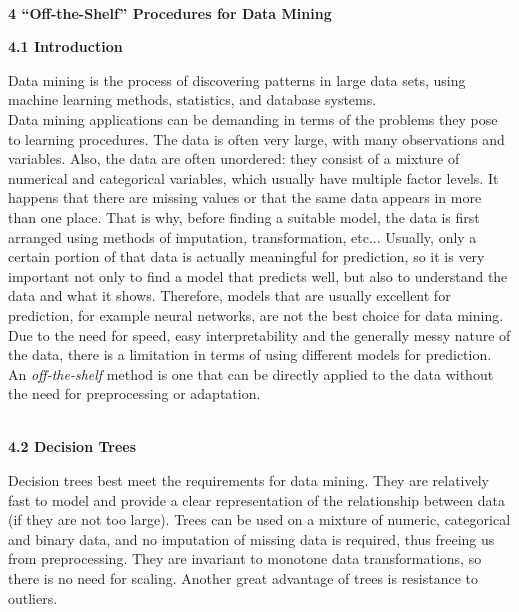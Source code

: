 \documentclass[12pt, letterpaper, twoside]{article}
\begin{document}
\begin{center}
\textbf{\large{\\4 “Off-the-Shelf” Procedures for Data Mining}\\}
\end{center}
\begin{center}
\textbf{\large{4.1 Introduction}\\}
\end{center}
\hspace*{4ex}Data mining is the process of discovering patterns in large data sets, using machine learning methods, statistics, and database systems.\\ 
\hspace*{4ex}Data mining applications can be demanding in terms of the problems they pose to learning procedures. The data is often very large, with many observations and variables. Also, the data are often unordered: they consist of a mixture of numerical and categorical variables, which usually have multiple factor levels. It happens that there are missing values or that the same data appears in more than one place. That is why, before finding a suitable model, the data is first arranged using methods of imputation, transformation, etc... Usually, only a certain portion of that data is actually meaningful for prediction, so it is very important not only to find a model that predicts well, but also to understand the data and what it shows. Therefore, models that are usually excellent for prediction, for example neural networks, are not the best choice for data mining. 
\hspace*{4ex}Due to the need for speed, easy interpretability and the generally messy nature of the data, there is a limitation in terms of using different models for prediction. An \emph{off-the-shelf} method is one that can be directly applied to the data without the need for preprocessing or adaptation.
\pagebreak
\begin{center}
\textbf{\large{\\4.2 Decision Trees}\\}
\end{center}
\hspace*{4ex}Decision trees best meet the requirements for data mining. They are relatively fast to model and provide a clear representation of the relationship between data (if they are not too large). Trees can be used on a mixture of numeric, categorical and binary data, and no imputation of missing data is required, thus freeing us from preprocessing. They are invariant to monotone data transformations, so there is no need for scaling. Another great advantage of trees is resistance to outliers.\\
\end{document}
